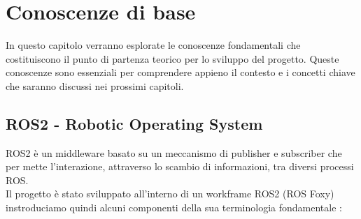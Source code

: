 \chapter{Conoscenze di base} 
In questo capitolo verranno esplorate le conoscenze fondamentali che costituiscono il punto di partenza teorico per lo sviluppo del progetto. Queste conoscenze sono
 essenziali per comprendere appieno il contesto e i concetti chiave che saranno discussi
 nei prossimi capitoli.
 
\section{ROS2 - Robotic Operating System}
ROS2 è un middleware basato su un meccanismo di publisher e subscriber che per
mette l’interazione, attraverso lo scambio di informazioni, tra diversi processi ROS.\\
Il progetto è stato sviluppato all'interno di un workframe ROS2 (ROS Foxy)\cite{doi:10.1126/scirobotics.abm6074} instroduciamo quindi alcuni componenti della sua terminologia fondamentale \cite{rosDocumentation}: \\
